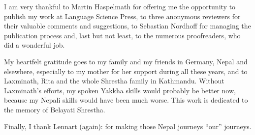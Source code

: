 I am very thankful to Martin Haspelmath for offering me the opportunity to publish my work at Language Science Press, to three anonymous reviewers for their valuable comments and suggestions, to Sebastian Nordhoff for managing the publication process and, last but not least, to the numerous proofreaders, who did a wonderful job.

My heartfelt gratitude goes to my family and my friends in Germany, Nepal and elsewhere, especially to my mother for her support during all these years, and to Laxminath, Rita and the whole Shrestha family in Kathmandu. Without Laxminath's efforts, my spoken Yakkha skills would probably be better now, because my Nepali skills would have been much worse. This work is dedicated to the memory of Belayati Shrestha.

Finally, I thank Lennart (again): for making those Nepal journeys  “our” journeys.

